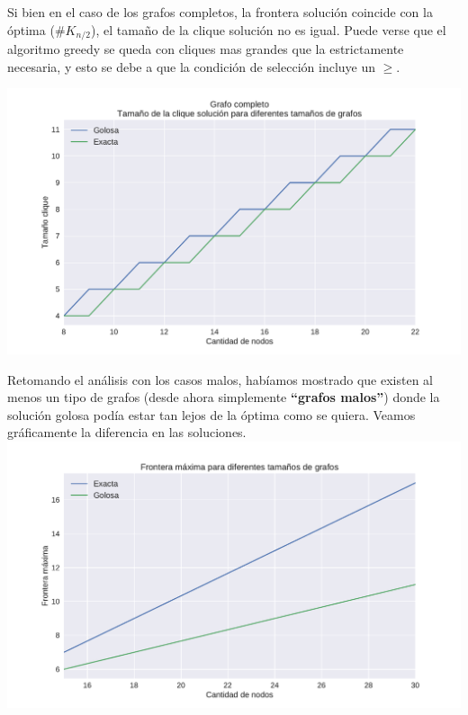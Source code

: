 Si bien en el caso de los grafos completos, la frontera solución coincide con la óptima ($\#K_{n/2}$), el tamaño de la clique solución no es igual. Puede verse que el algoritmo greedy se queda con cliques mas grandes que la estrictamente necesaria, y esto se debe a que la condición de selección incluye un $\geq$.

{\centering
    \includegraphics[width=1\textwidth]{informe/imgs/exp_completo_clique_greedy_exacta.pdf} \\
}

Retomando el análisis con los casos malos, habíamos mostrado que existen al menos un tipo de grafos (desde ahora simplemente \textbf{``grafos malos''}) donde la solución golosa podía estar tan lejos de la óptima como se quiera. Veamos gráficamente la diferencia en las soluciones. \\

{\centering
    \includegraphics[width=1\textwidth]{informe/imgs/exp_malo_frontera_greedy_exacta.pdf} \\
}
$ $\newline

